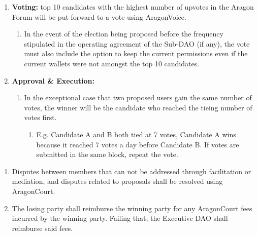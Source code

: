 \begin{enumerate}
\begin{enumerate}
\begin{enumerate}
			\item \textbf{Voting:} top 10 candidates with the highest number of upvotes in the Aragon Forum will be put forward to a vote using \gls{AragonVoice}.
			\begin{enumerate}
				\item In the event of the election being proposed before the frequency stipulated in the operating agreement of the Sub-\ac{DAO} (if any), the vote must also include the option to keep the current permissions even if the current wallets were not amongst the top 10 candidates.
			\end{enumerate}

			\item \textbf{Approval \& Execution:}
			\begin{enumerate}
				\item In the exceptional case that two proposed users gain the same number of votes, the winner will be the candidate who reached the tieing number of votes first.
				\begin{enumerate}
					\item E.g. Candidate A and B both tied at 7 votes, Candidate A wins because it reached 7 votes a day before Candidate B.
					If votes are submitted in the same block, repeat the vote.
				\end{enumerate}
			
			\end{enumerate}
		
		\end{enumerate}
	
	\end{enumerate}
	
	\begin{enumerate}
		\item Disputes between members that can not be addressed through facilitation or mediation, and disputes related to proposals shall be resolved using \gls{AragonCourt}.
		\item The losing party shall reimburse the winning party for any \gls{AragonCourt} fees incurred by the winning party. Failing that, the Executive \ac{DAO} shall reimburse said fees.
	\end{enumerate}

\end{enumerate}